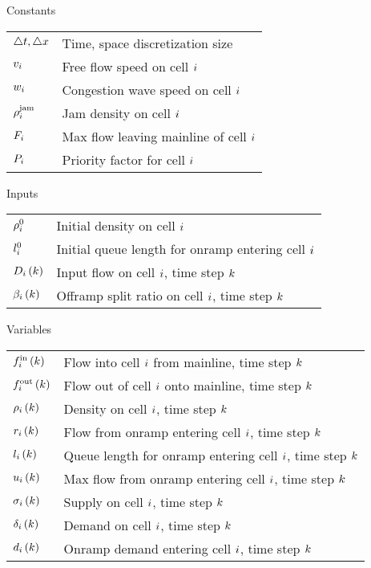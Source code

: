 
Constants
\begin{longtable}{ll}
$\triangle t,\triangle x$ & Time, space discretization size\tabularnewline
$v_{i}$ & Free flow speed on cell $i$\tabularnewline
$w_{i}$ & Congestion wave speed on cell $i$\tabularnewline
$\rho^{\text{jam}}_{i}$ & Jam density on cell $i$\tabularnewline
$F_{i}$ & Max flow leaving mainline of cell $i$\tabularnewline
$P_{i}$ & Priority factor for cell $i$\tabularnewline
\end{longtable}

Inputs
\begin{longtable}{ll}
$\rho_{i}^{0}$ & Initial density on cell $i$\tabularnewline
$l_{i}^{0}$ & Initial queue length for onramp entering cell $i$\tabularnewline
$D_{i}\left(k\right)$ & Input flow on cell $i$, time step $k$\tabularnewline
$\beta_{i}\left(k\right)$ & Offramp split ratio on cell $i$, time step $k$\tabularnewline
\end{longtable}

Variables
\begin{longtable}{ll}
$f_{i}^{\text{in}}\left(k\right)$ & Flow into cell $i $ from mainline, time step $k$\tabularnewline
$f_{i}^{\text{out}}\left(k\right)$ & Flow out of cell $i$ onto mainline, time step $k$\tabularnewline
$\rho_{i}\left(k\right)$ & Density on cell $i$, time step $k$\tabularnewline
$r_{i}\left(k\right)$ & Flow from onramp entering cell $i$, time step $k$\tabularnewline
$l_{i}\left(k\right)$ & Queue length for onramp entering cell $i$, time step $k$\tabularnewline
$u_{i}\left(k\right)$ & Max flow from onramp entering cell $i$, time step $k$\tabularnewline
$\sigma_{i}\left(k\right)$ & Supply on cell $i$, time step $k$\tabularnewline
$\delta_{i}\left(k\right)$ & Demand on cell $i$, time step $k$\tabularnewline
$d_{i}\left(k\right)$ & Onramp demand entering cell $i$, time step $k$\tabularnewline
\end{longtable}